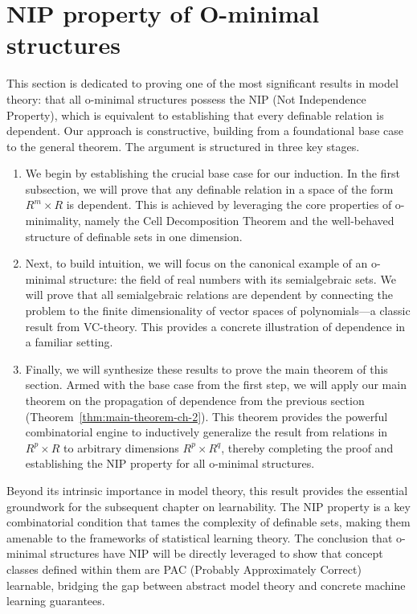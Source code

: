 \section{NIP property of O-minimal structures}

This section is dedicated to proving one of the most significant results in model theory: that all o-minimal structures possess the NIP (Not Independence Property), which is equivalent to establishing that every definable relation is dependent. Our approach is constructive, building from a foundational base case to the general theorem. The argument is structured in three key stages.

\begin{enumerate}
    \item We begin by establishing the crucial base case for our induction. In the first subsection, we will prove that any definable relation in a space of the form $R^m \times R$ is dependent. This is achieved by leveraging the core properties of o-minimality, namely the Cell Decomposition Theorem and the well-behaved structure of definable sets in one dimension.

    \item Next, to build intuition, we will focus on the canonical example of an o-minimal structure: the field of real numbers with its semialgebraic sets. We will prove that all semialgebraic relations are dependent by connecting the problem to the finite dimensionality of vector spaces of polynomials—a classic result from VC-theory. This provides a concrete illustration of dependence in a familiar setting.

    \item Finally, we will synthesize these results to prove the main theorem of this section. Armed with the base case from the first step, we will apply our main theorem on the propagation of dependence from the previous section (Theorem~\ref{thm:main-theorem-ch-2}). This theorem provides the powerful combinatorial engine to inductively generalize the result from relations in $R^p \times R$ to arbitrary dimensions $R^p \times R^q$, thereby completing the proof and establishing the NIP property for all o-minimal structures.
\end{enumerate}

Beyond its intrinsic importance in model theory, this result provides the essential groundwork for the subsequent chapter on learnability. The NIP property is a key combinatorial condition that tames the complexity of definable sets, making them amenable to the frameworks of statistical learning theory. The conclusion that o-minimal structures have NIP will be directly leveraged to show that concept classes defined within them are PAC (Probably Approximately Correct) learnable, bridging the gap between abstract model theory and concrete machine learning guarantees.



